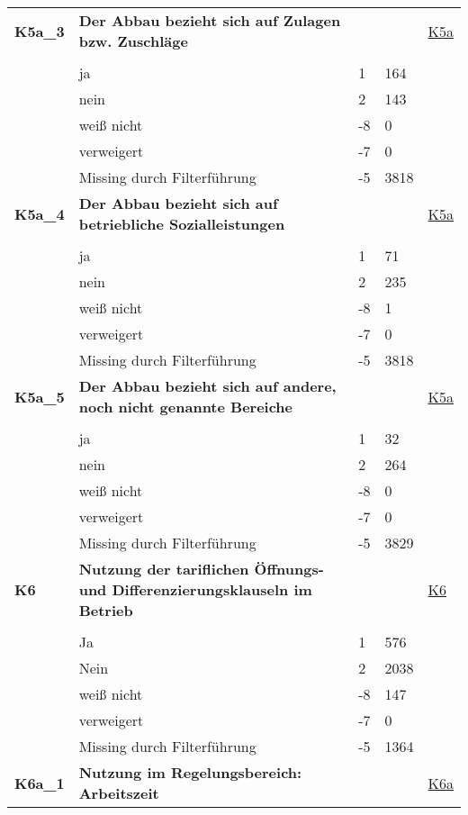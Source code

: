 \begin{longtable}{| L{2.5cm} | L{8.25cm}| C{1.5cm} | R{1.25cm} | C{2.25cm} |  }
   \midrule
\textbf{K5a\_3}\label{var:suf:K5a:3} & \textbf{Der Abbau bezieht sich auf Zulagen bzw. Zuschläge} &  &  & \hyperref[K5a]{K5a} \\ 
   &  &  &  &  \\ 
   & ja & 1 & 164 &  \\ 
   & nein & 2 & 143 &  \\ 
   & weiß nicht & -8 & 0 &  \\ 
   & verweigert & -7 & 0 &  \\ 
   & Missing durch Filterführung & -5 & 3818 &  \\ 
   \midrule
\textbf{K5a\_4}\label{var:suf:K5a:4} & \textbf{Der Abbau bezieht sich auf betriebliche Sozialleistungen} &  &  & \hyperref[K5a]{K5a} \\ 
   &  &  &  &  \\ 
   & ja & 1 & 71 &  \\ 
   & nein & 2 & 235 &  \\ 
   & weiß nicht & -8 & 1 &  \\ 
   & verweigert & -7 & 0 &  \\ 
   & Missing durch Filterführung & -5 & 3818 &  \\ 
   \midrule
\textbf{K5a\_5}\label{var:suf:K5a:5} & \textbf{Der Abbau bezieht sich auf andere, noch nicht genannte Bereiche} &  &  & \hyperref[K5a]{K5a} \\ 
   &  &  &  &  \\ 
   & ja & 1 & 32 &  \\ 
   & nein & 2 & 264 &  \\ 
   & weiß nicht & -8 & 0 &  \\ 
   & verweigert & -7 & 0 &  \\ 
   & Missing durch Filterführung & -5 & 3829 &  \\ 
   \midrule
\textbf{K6}\label{var:suf:K6} & \textbf{Nutzung der tariflichen Öffnungs- und Differenzierungsklauseln im Betrieb} &  &  & \hyperref[K6]{K6} \\ 
   &  &  &  &  \\ 
   & Ja & 1 & 576 &  \\ 
   & Nein & 2 & 2038 &  \\ 
   & weiß nicht & -8 & 147 &  \\ 
   & verweigert & -7 & 0 &  \\ 
   & Missing durch Filterführung & -5 & 1364 &  \\ 
   \midrule
\textbf{K6a\_1}\label{var:suf:K6a:1} & \textbf{Nutzung im Regelungsbereich: Arbeitszeit} &  &  & \hyperref[K6a]{K6a} \\ 

\end{longtable}
